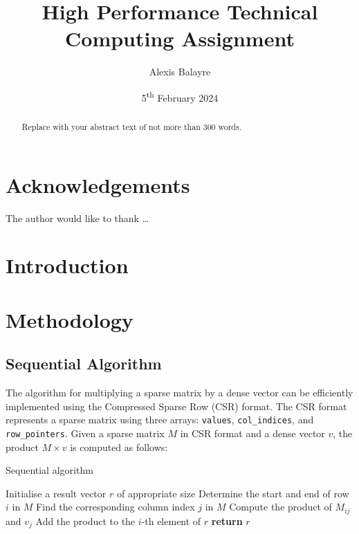 \documentclass[12pt,oneside]{book} %
\title{High Performance Technical Computing Assignment}
\author{Alexis Balayre}
\date{5\textsuperscript{th} February 2024}
\begin{document}
\frontmatter

\maketitle

\begin{abstract}
    Replace with your abstract text of not more than 300 words.
\end{abstract}

\chapter{Acknowledgements}
The author would like to thank \dots

{
    \clearpage
    \singlespacing
    {
        \tableofcontents
    }
    \clearpage

    \listoffigures

    \listoftables
}

\mainmatter
\pagestyle{fancy}
\fancyhead[L]{\nouppercase{\leftmark}}
\fancyhead[R]{\nouppercase{\rightmark}}

\chapter{Introduction}

\chapter{Methodology}
\section{Sequential Algorithm}

The algorithm for multiplying a sparse matrix by a dense vector can be
efficiently implemented using the Compressed Sparse Row (CSR) format. The CSR
format represents a sparse matrix using three arrays: \texttt{values},
\texttt{col\_indices}, and \texttt{row\_pointers}. Given a sparse matrix \( M
\) in CSR format and a dense vector \( v \), the product \( M \times v \) is
computed as follows:

\begin{algorithm}[H]
    \caption{Sequential algorithm}
    \begin{algorithmic}[1]
        \State Initialise a result vector $r$ of appropriate size
        \State Determine the start and end of row $i$ in $M$
        \State Find the corresponding column index $j$ in $M$
        \State Compute the product of $M_{ij}$ and $v_j$
        \State Add the product to the $i$-th element of $r$
        \EndFor
        \EndFor
        \State \textbf{return} $r$
        \EndProcedure
    \end{algorithmic}
\end{algorithm}
\end{document}
